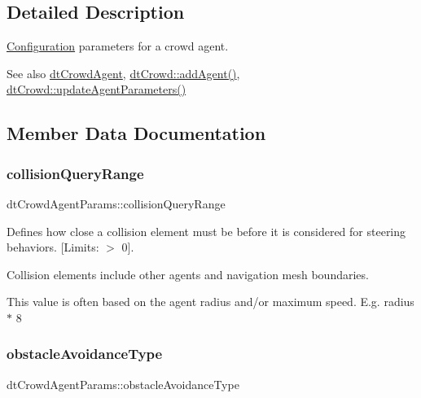 \subsection{Detailed Description}
\hyperlink{classConfiguration}{Configuration} parameters for a crowd agent.

\begin{DoxySeeAlso}{See also}
\hyperlink{structdtCrowdAgent}{dt\+Crowd\+Agent}, \hyperlink{classdtCrowd_ae8c89febfd979a6b963c62d8cdb60653}{dt\+Crowd\+::add\+Agent()}, \hyperlink{classdtCrowd_a6ed4aa0026c21593daa9ea12c71f84c2}{dt\+Crowd\+::update\+Agent\+Parameters()} 
\end{DoxySeeAlso}


\subsection{Member Data Documentation}
\mbox{\label{structdtCrowdAgentParams_a5e1c7373b02e2f926360e3d3130be068}} 
\subsubsection{\texorpdfstring{collision\+Query\+Range}{collisionQueryRange}}
{\footnotesize\ttfamily dt\+Crowd\+Agent\+Params\+::collision\+Query\+Range}



Defines how close a collision element must be before it is considered for steering behaviors. \mbox{[}Limits\+: $>$ 0\mbox{]}. 

\begin{DoxyParagraph}{}

\end{DoxyParagraph}
Collision elements include other agents and navigation mesh boundaries.

This value is often based on the agent radius and/or maximum speed. E.\+g. radius $\ast$ 8 \mbox{\label{structdtCrowdAgentParams_ae8be062f1d9616d17d8b536f7a501498}} 
\subsubsection{\texorpdfstring{obstacle\+Avoidance\+Type}{obstacleAvoidanceType}}
{\footnotesize\ttfamily dt\+Crowd\+Agent\+Params\+::obstacle\+Avoidance\+Type}

